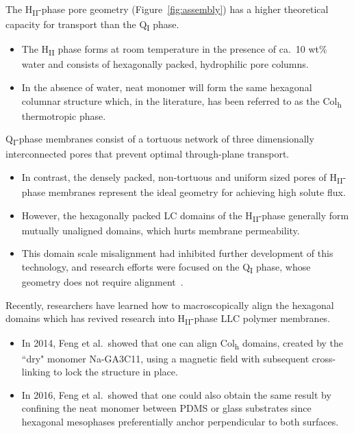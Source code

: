\documentclass{article}
\begin{document}
  The H\textsubscript{II}-phase pore geometry (Figure~\ref{fig:assembly}) has a
  higher theoretical capacity for transport than the Q\textsubscript{I} phase.
  \begin{itemize}
	  \item The H\textsubscript{II} phase forms at room temperature in the 
	  presence of ca.~10 wt\% water and consists of hexagonally packed, 
	  hydrophilic pore columns\cite{smith_ordered_1997}. 
	  \item In the absence of water, neat monomer will form the same hexagonal
	  columnar structure which, in the literature, has been referred to as the
	  Col\textsubscript{h} thermotropic phase\cite{feng_scalable_2014}.
  \end{itemize}

  Q\textsubscript{I}-phase membranes consist of a tortuous network of three
  dimensionally interconnected pores that prevent optimal through-plane
  transport. 
  \begin{itemize}
    \item In contrast, the densely packed, non-tortuous and uniform sized
    pores of H\textsubscript{II}-phase membranes represent the ideal geometry
    for achieving high solute flux\cite{matyka_tortuosity-porosity_2008}.  
    \item However, the hexagonally packed LC domains of the H\textsubscript{II}-phase
    generally form mutually unaligned domains, which hurts membrane permeability. 
    \item This domain scale misalignment had inhibited further development of 
    this technology, and research efforts were focused on the Q\textsubscript{I}
    phase, whose geometry does not require alignment~\cite{zhou_new_2007}.
  \end{itemize}

  Recently, researchers have learned how to macroscopically align the
  hexagonal domains which has revived research into H\textsubscript{II}-phase LLC
  polymer membranes. 
  \begin{itemize}
    \item In 2014, Feng et al.~showed that one can align Col\textsubscript{h}
    domains, created by the ``dry" monomer Na-GA3C11, using a magnetic field
	with subsequent cross-linking to lock the structure in place\cite{feng_scalable_2014}.
	\item In 2016, Feng et al.~showed that one could also obtain the same result
	by confining the neat monomer between PDMS or glass substrates since hexagonal
	mesophases preferentially anchor perpendicular to both surfaces\cite{feng_thin_2016}.
  \end{itemize}
  
\end{document}
